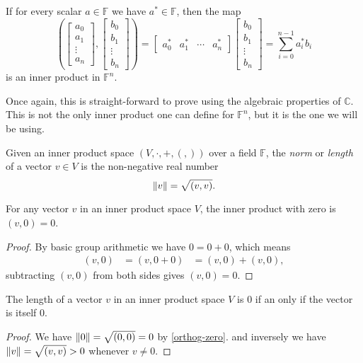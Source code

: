 \begin{prop}
	If for every scalar $a \in \mathbb{F}$ we have $a^* \in \mathbb{F}$, then the map
\[
\left(
\left[\begin{matrix} a_0\\a_1\\\vdots\\a_n\end{matrix}\right]
,
\left[\begin{matrix} b_0\\b_1\\\vdots\\b_n\end{matrix}\right]
\right)
=
\left[\begin{matrix} a_0^*&a_1^*&\cdots&a_n^*\end{matrix}\right]
\left[\begin{matrix} b_0\\b_1\\\vdots\\b_n\end{matrix}\right]
= \sum_{i=0}^{n-1} a_i^*b_i
\]
is an inner product in $\mathbb{F}^n$.
\end{prop}
Once again, this is straight-forward to prove using the algebraic properties of $\mathbb{C}$. This is not the only inner product one can define for $\mathbb{F}^n$, but it is the one we will be using.

\begin{define}[Norm]
	Given an inner product space $(V, \cdot, + , (,))$ over a field $\mathbb{F}$, the \emph{norm} or \emph{length} of a vector $v \in V$ is the non-negative real number
	\[\left\Vert v \right\Vert = \sqrt{(v,v)}.\]
\end{define}

\begin{prop}\label{orthog-zero}
	For any vector $v$ in an inner product space $V$, the inner product with zero is $(v, 0) = 0$.
\end{prop}
\begin{proof}
	By basic group arithmetic we have $0 = 0 + 0$, which means
	\begin{align*}
		(v, 0)
		&= (v, 0+0)
		&= (v,0)+(v,0),
	\end{align*}
	subtracting $(v,0)$ from both sides gives $(v,0) = 0$.
\end{proof}

\begin{prop}\label{norm-zero}
	 The length of a vector $v$ in an inner product space $V$ is 0 if an only if the vector is itself 0.
\end{prop}
\begin{proof}
	We have $\left\Vert 0 \right\Vert = \sqrt{(0,0)} = 0$ by \autoref{orthog-zero}. and inversely we have $\left\Vert v \right\Vert = \sqrt{(v,v)} > 0$ whenever $v \neq 0$.
\end{proof}

